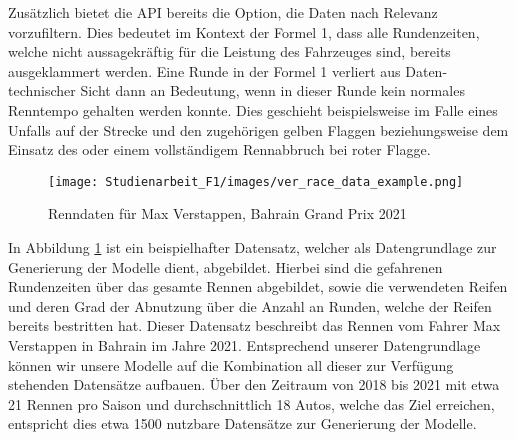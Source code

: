 Zusätzlich bietet die  API bereits die Option, die Daten nach Relevanz vorzufiltern. Dies bedeutet im Kontext der Formel 1, dass alle Rundenzeiten, welche nicht aussagekräftig für die Leistung des Fahrzeuges sind, bereits ausgeklammert werden. Eine Runde in der Formel 1 verliert aus Daten-technischer Sicht dann an Bedeutung, wenn in dieser Runde kein normales Renntempo gehalten werden konnte. Dies geschieht beispielsweise im Falle eines Unfalls auf der Strecke und den zugehörigen gelben Flaggen beziehungsweise dem Einsatz des  oder einem vollständigem Rennabbruch bei roter Flagge.
\begin{figure}[H]
    \centering
    \texttt{[image: Studienarbeit\_F1/images/ver\_race\_data\_example.png]}
    \caption{Renndaten für Max Verstappen, Bahrain Grand Prix 2021}
    \label{fig:race_data_2021_1_VER}
\end{figure}

In Abbildung \ref{fig:race_data_2021_1_VER} ist ein beispielhafter Datensatz, welcher als Datengrundlage zur Generierung der Modelle dient, abgebildet. Hierbei sind die gefahrenen Rundenzeiten über das gesamte Rennen abgebildet, sowie die verwendeten Reifen und deren Grad der Abnutzung über die Anzahl an Runden, welche der Reifen bereits bestritten hat. Dieser Datensatz beschreibt das Rennen vom Fahrer Max Verstappen in Bahrain im Jahre 2021. Entsprechend unserer Datengrundlage können wir unsere Modelle auf die Kombination all dieser zur Verfügung stehenden Datensätze aufbauen. Über den Zeitraum von 2018 bis 2021 mit etwa 21 Rennen pro Saison und durchschnittlich 18 Autos, welche das Ziel erreichen, entspricht dies etwa 1500 nutzbare Datensätze zur Generierung der Modelle.




